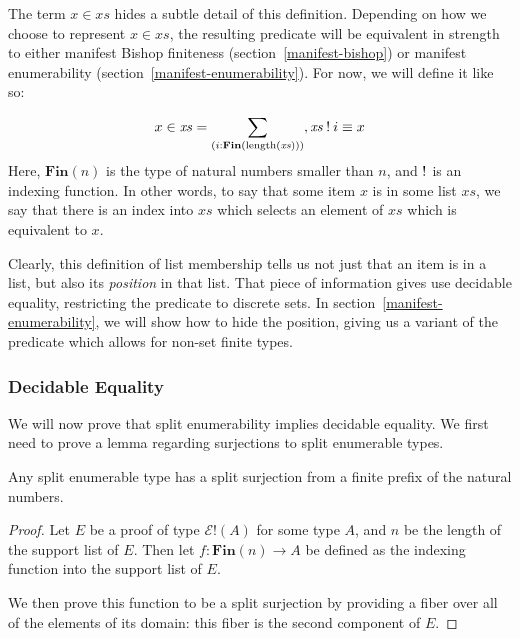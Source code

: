 \begin{refsection}
The term \(x \in \mathit{xs}\) hides a subtle detail of this definition.
Depending on how we choose to represent \(x \in \mathit{xs}\), the resulting
predicate will be equivalent in strength to either manifest Bishop finiteness
(section~\ref{manifest-bishop}) or manifest enumerability
(section~\ref{manifest-enumerability}).
For now, we will define it like so:

\begin{definition} \label{list-membership}
  \begin{equation}
    x \in \mathit{xs} = \sum_{(i : \mathbf{Fin}(\text{length}(\mathit{xs})))} , \mathit{xs} \mathbin{!} i \equiv x
  \end{equation}
  Here, \(\mathbf{Fin}(n)\) is the type of natural numbers smaller than \(n\),
  and \(\mathbin{!}\) is an indexing function.
  In other words, to say that some item \(x\) is in some list \(\mathit{xs}\),
  we say that there is an index into \(\mathit{xs}\) which selects an element of
  \(\mathit{xs}\) which is equivalent to \(x\).
\end{definition}

Clearly, this definition of list membership tells us not just that an item is in
a list, but also its \emph{position} in that list.
That piece of information gives use decidable equality, restricting the
predicate to discrete sets.
In section~\ref{manifest-enumerability}, we will show how to hide the position,
giving us a variant of the predicate which allows for non-set finite types.
\subsubsection{Decidable Equality}
We will now prove that split enumerability implies decidable equality.
We first need to prove a lemma regarding surjections to split enumerable types.
\begin{lemma} \label{split-enum-surj}
  Any split enumerable type has a split surjection from a finite prefix of the
  natural numbers.
\end{lemma}
\begin{proof} 
  Let \(E\) be a proof of type \(\mathcal{E}!(A)\) for some type \(A\), and
  \(n\) be the length of the support list of \(E\).
  Then let \(f : \textbf{Fin}(n) \rightarrow A\) be defined as the indexing
  function into the support list of \(E\).

  We then prove this function to be a split surjection by providing a fiber over
  all of the elements of its domain: this fiber is the second component of \(E\).


\end{proof}
\end{refsection}
